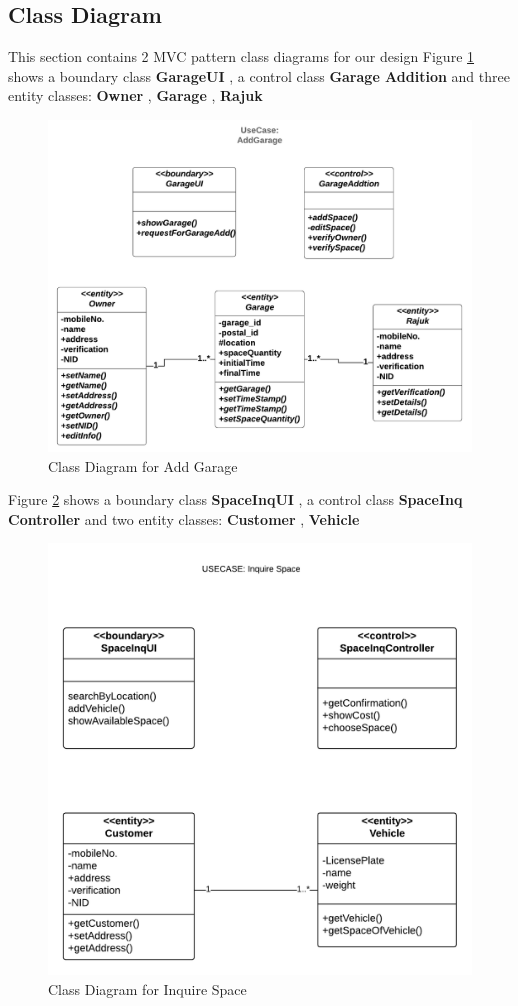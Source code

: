 \documentclass[12pt, english]{article}
\begin{document}
\subsection{Class Diagram}%
This section contains 2 MVC pattern class diagrams for our design
\newline
Figure \ref{fig:cls_ag1} shows a boundary class \textbf{GarageUI} , a control class \textbf{Garage Addition} and three entity classes: {\textbf{Owner} , \textbf{Garage} , \textbf{Rajuk}}\\
\begin{figure}[h!]
                \centering
                \includegraphics[width=.6\textwidth]{class_ag.png}
                \caption{Class Diagram for Add Garage}
                \label{fig:cls_ag1}
\end{figure}
Figure \ref{fig:cls_ag2} shows a boundary class \textbf{SpaceInqUI} , a control class \textbf{SpaceInq Controller} and two entity classes: { \textbf{Customer} , \textbf{Vehicle}}\\
\begin{figure}[h!]
                \centering
                \includegraphics[width=.6\textwidth]{class_inq.png}
                \caption{Class Diagram for Inquire Space}
                \label{fig:cls_ag2}
\end{figure}
\newpage
\end{document}
